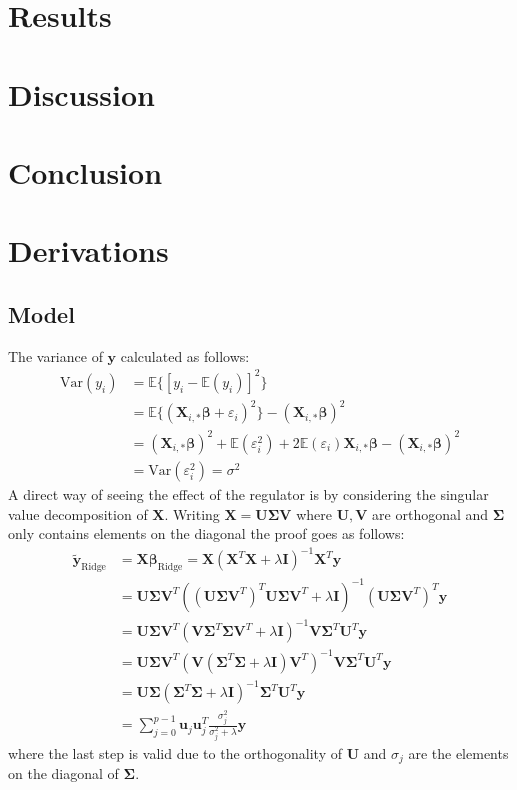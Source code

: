 \documentclass[%
reprint,
amsmath,amssymb,
aps,
pra,
]{revtex4-2}
\begin{document}
\section{Results}

\section{Discussion}

\section{Conclusion}




\appendix
\section{Derivations}
\label{Appendix:Derivations}

\subsection{Model}
The variance of $\bm y$ calculated as follows:
\begin{align*}
	\text{Var}(y_i)&=\mathbb{E}\{[y_i-\mathbb{E}(y_i)]^2\}\\
	&=\mathbb{E}\{(\bm X_{i,*}\bm\beta+\varepsilon_i)^2\}-(\bm X_{i,*}\bm\beta)^2\\
	&=(\bm X_{i,*}\bm\beta)^2+\mathbb{E}(\varepsilon_i^2)+2\mathbb{E}(\varepsilon_i)\bm X_{i,*}\bm\beta-(\bm X_{i,*}\bm\beta)^2\\
	&=\text{Var}(\varepsilon_i^2)=\sigma^2
\end{align*}
A direct way of seeing the effect of the regulator is by considering the singular value decomposition of $\bm X$. Writing $\bm X=\bm U\bm \Sigma\bm V$ where $\bm U,\bm V$ are orthogonal and $\bm \Sigma$ only contains elements on the diagonal the proof goes as follows:
\begin{align*}
	\tilde{\bm{y}}_\text{Ridge}&=\bm{X\beta}_\text{Ridge}=\bm{X}(\bm{X}^T\bm{X}+\lambda\bm I)^{-1}\bm{X}^T\bm{y}\\
	&=\bm{U\Sigma V}^T((\bm{U\Sigma V}^T)^T\bm{U\Sigma V}^T+\lambda\bm I)^{-1}(\bm{U\Sigma V}^T)^T\bm{y}\\
	&=\bm{U\Sigma V}^T(\bm{V}\bm{\Sigma}^T\bm{\Sigma}\bm{V}^T+\lambda\bm I)^{-1}\bm{V}\bm{\Sigma}^T\bm{U}^T\bm{y}\\
	&=\bm{U\Sigma V}^T(\bm{V}({\bm\Sigma}^T\bm{\Sigma}+\lambda\bm I)\bm{V}^T)^{-1}\bm{V}\bm{\Sigma}^T\bm{U}^T\bm{y}\\
	&=\bm{U\Sigma }({\bm\Sigma}^T\bm{\Sigma}+\lambda\bm I)^{-1}\bm{\Sigma}^T\bm{U}^T\bm{y}\\
	&=\sum_{j=0}^{p-1}\bm{u}_j\bm{u}_j^T\frac{\sigma_j^2}{\sigma_j^2+\lambda}\bm{y}
\end{align*}
where the last step is valid due to the orthogonality of $\bm U$ and $\sigma_j$ are the elements on the diagonal of $\bm\Sigma$.
\end{document}

